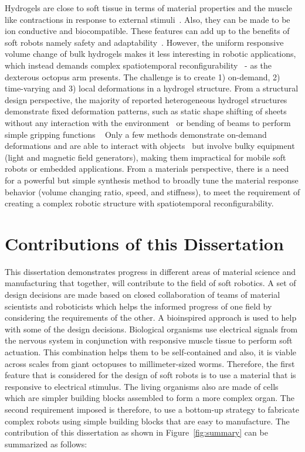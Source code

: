 Hydrogels are close to soft tissue in terms of material properties and the muscle like contractions in response to external stimuli~\cite{Liu2020}. Also, they can be made to be ion conductive and biocompatible. These features can add up to the benefits of soft robots namely safety and adaptability~\cite{Lee2020}. However, the uniform responsive volume change of bulk hydrogels makes it less interesting in robotic applications, which instead demands complex spatiotemporal reconfigurability~\cite{Erol2019} - as the dexterous octopus arm presents. The challenge is to create 1) on-demand, 2) time-varying and 3) local deformations in a hydrogel structure. From a structural design perspective, the majority of reported heterogeneous hydrogel structures demonstrate fixed deformation patterns, such as static shape shifting of sheets without any interaction with the environment~\cite{SydneyGladman2016, Ma2019, Jeon2017} or bending of beams to perform simple gripping functions ~\cite{Wang2017, Ma2018, Duan2017} Only a few methods demonstrate on-demand deformations and are able to interact with objects~\cite{Mourran2017, Palagi2016, Kim2018} but involve bulky equipment (light and magnetic field generators), making them impractical for mobile soft robots or embedded applications.
From a materials perspective, there is a need for a powerful but simple synthesis method to broadly tune the material response behavior (volume changing ratio, speed, and stiffness), to meet the requirement of creating a complex robotic structure with spatiotemporal reconfigurability.

\section{Contributions of this Dissertation}
This dissertation demonstrates progress in different areas of material science and manufacturing  that together, will contribute to the field of soft robotics. A set of design decisions are made based on closed collaboration of teams of material scientists and roboticists which helps the informed progress of one field by considering the requirements of the other. A bioinspired approach is used to help with some of the design decisions. Biological organisms use electrical signals from the nervous system in conjunction with responsive muscle tissue to perform soft actuation. This combination helps them to be self-contained and also, it is viable across scales from giant octopuses to millimeter-sized worms. Therefore, the first feature that is considered for the design of soft robots is to use a material that is responsive to electrical stimulus. The living organisms also are made of cells which are simpler building blocks assembled to form a more complex organ. The second requirement imposed is therefore, to use a bottom-up strategy to fabricate complex robots using simple building blocks that are easy to manufacture. The contribution of this dissertation as shown in Figure~\ref{fig:summary} can be summarized as follows:

